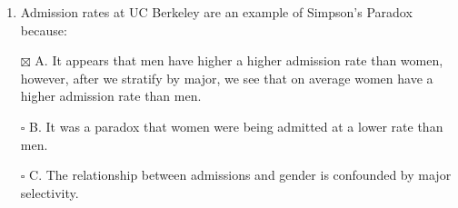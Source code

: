 \documentclass[
]{article}
\providecommand{\tightlist}{%
  \setlength{\itemsep}{0pt}\setlength{\parskip}{0pt}}
\begin{document}
\begin{enumerate}
\def\labelenumi{\arabic{enumi}.}
\tightlist
\item
  Admission rates at UC Berkeley are an example of Simpson's Paradox
  because:
\end{enumerate}

\begin{itemize}
\tightlist
\item[$\boxtimes$]
  A. It appears that men have higher a higher admission rate than women,
  however, after we stratify by major, we see that on average women have
  a higher admission rate than men.
\item[$\square$]
  B. It was a paradox that women were being admitted at a lower rate
  than men.
\item[$\square$]
  C. The relationship between admissions and gender is confounded by
  major selectivity.
\end{itemize}
\end{document}
